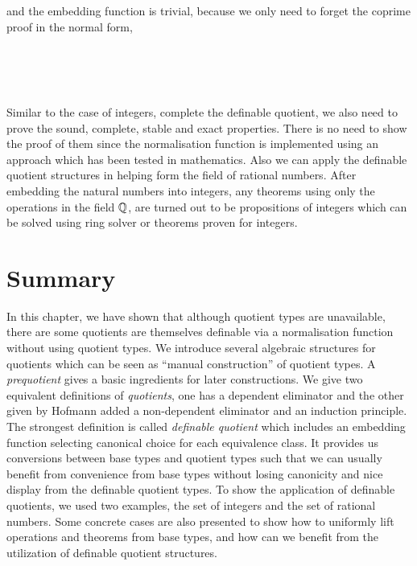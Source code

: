 and the embedding function is trivial, because we only need to forget
the coprime proof in the normal form,

\begin{code}
\\
\> \AgdaSymbol{:}   \<%
\\
\>   \AgdaSymbol{=} \AgdaSymbol{(} \AgdaSymbol{(} \AgdaSymbol{))}  \AgdaSymbol{(} \AgdaSymbol{)}\<%
\\
\end{code}

Similar to the case of integers, complete the definable quotient, we
also need to prove the sound, complete, stable and exact
properties. There is no need to show the proof of them since the
normalisation function is implemented using an approach which has been
tested in mathematics.
Also we can apply the definable quotient structures in helping form
the field of rational numbers. After embedding the natural numbers
into integers, any theorems using only the operations in the field
$\mathbb{Q}$, are turned out to be propositions of integers which can be
solved using ring solver or theorems proven for integers.



\section{Summary}

In this chapter, we have shown that 
although quotient
types are unavailable, there are some quotients are
themselves definable via a normalisation function without using quotient types. We introduce several
algebraic structures for quotients which can be seen as ``manual construction'' of quotient types.
A \emph{prequotient} gives a basic ingredients for later
constructions. We give two equivalent definitions of \emph{quotients},
one has a dependent eliminator and the other given by Hofmann added
 a non-dependent eliminator  and an induction principle.
The strongest definition is called \emph{definable quotient} which includes an embedding function selecting canonical choice for each
equivalence class. It provides us conversions between base types and
quotient types such that we can usually benefit from convenience from base types without losing canonicity and nice display from the
definable quotient types. To show the application of definable quotients, we
used two examples, the set of integers and the set of rational
numbers. Some concrete cases are also presented to show how to
uniformly lift operations and theorems from base types, and how can we
benefit from the utilization of definable quotient structures.





